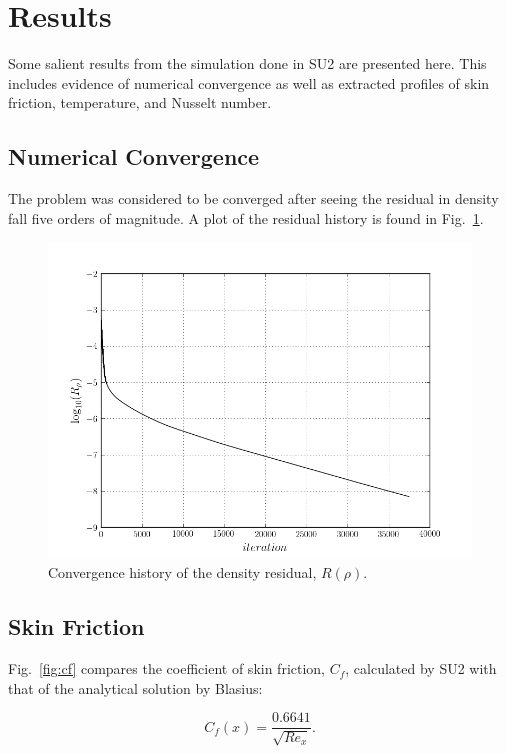 \documentclass[12pt,letterpaper]{article}
\begin{document}
\section*{Results}
Some salient results from the simulation done in SU2 are presented here. This includes evidence of numerical convergence as well as extracted profiles of skin friction, temperature, and Nusselt number.

\subsection*{Numerical Convergence}
The problem was considered to be converged after seeing the residual in density fall five orders of magnitude. A plot of the residual history is found in Fig.~\ref{fig:rho_res}.

\begin{figure}[h] 
\centering
\includegraphics[width=\linewidth]{rho_residual.png}
\caption{Convergence history of the density residual, $R(\rho)$.}
\label{fig:rho_res}
\end{figure}

\subsection*{Skin Friction}
Fig.~\ref{fig:cf} compares the coefficient of skin friction, $C_f$, calculated by SU2 with that of the analytical solution by Blasius:

\begin{equation*}
C_f(x) = \dfrac{0.6641}{\sqrt{Re_x}}.
\end{equation*}
\end{document}
